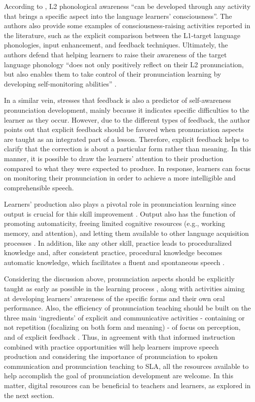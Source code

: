 \documentclass[english]{textolivre}
\begin{document}
According to \textcite[p. 104]{carlet_improving_2018}, L2 phonological awareness “can be developed through any activity that brings a specific aspect into the language learners’ consciousness”. The authors also provide some examples of consciousness-raising activities reported in the literature, such as the explicit comparison between the L1-target language phonologies, input enhancement, and feedback techniques. Ultimately, the authors defend that helping learners to raise their awareness of the target language phonology “does not only positively reflect on their L2 pronunciation, but also enables them to take control of their pronunciation learning by developing self-monitoring abilities” \cite[p. 104]{carlet_improving_2018}.

In a similar vein, \textcite{darcy_powerful_2018} stresses that feedback is also a predictor of self-awareness pronunciation development, mainly because it indicates specific difficulties to the learner as they occur. However, due to the different types of feedback, the author points out that explicit feedback should be favored when pronunciation aspects are taught as an integrated part of a lesson. Therefore, explicit feedback helps to clarify that the correction is about a particular form rather than meaning. In this manner, it is possible to draw the learners’ attention to their production compared to what they were expected to produce. In response, learners can focus on monitoring their pronunciation in order to achieve a more intelligible and comprehensible speech.

Learners’ production also plays a pivotal role in pronunciation learning since output is crucial for this skill improvement \cite{demenko_use_2010}. Output also has the function of promoting automaticity, freeing limited cognitive resources (e.g., working memory, and attention), and letting them available to other language acquisition processes \cite{grass_2015, ortega_understanding_2009}. In addition, like any other skill, practice leads to proceduralized knowledge and, after consistent practice, procedural knowledge becomes automatic knowledge, which facilitates a fluent and spontaneous speech \cite{dekeyser_skill_2015}.

Considering the discussion above, pronunciation aspects should be explicitly taught as early as possible in the learning process \cite{darcy_powerful_2018, derwing_efficacy_2018}, along with activities aiming at developing learners’ awareness of the specific forms and their own oral performance. Also, the efficiency of pronunciation teaching should be built on the three main ‘ingredients’ of explicit and communicative activities - containing or not repetition (focalizing on both form and meaning) - of focus on perception, and of explicit feedback \cite{darcy_powerful_2018}. Thus, in agreement with \textcite{thomson_effectiveness_2014} that informed instruction combined with practice opportunities will help learners improve speech production and considering the importance of pronunciation to spoken communication and pronunciation teaching to SLA, all the resources available to help accomplish the goal of pronunciation development are welcome. In this matter, digital resources can be beneficial to teachers and learners, as explored in the next section.
\end{document}
